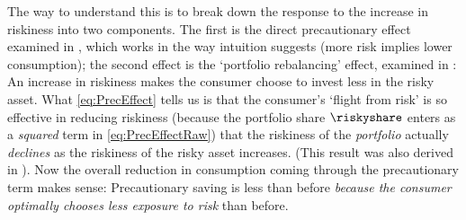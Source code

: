 The way to understand this is to break down the response to the
increase in riskiness into two components. The first is the direct
precautionary effect examined in , which works
in the way intuition suggests (more risk implies lower consumption);
the second effect is the `portfolio rebalancing' effect, examined in
: An increase in riskiness makes the consumer
choose to invest less in the risky asset.  What \eqref{eq:PrecEffect}
tells us is that the consumer's `flight from risk' is so effective in
reducing riskiness (because the portfolio share $\riskyshare$ enters
as a {\it squared} term in \eqref{eq:PrecEffectRaw}) that the
riskiness of the {\it portfolio} actually {\it declines} as the riskiness of
the risky asset increases.  (This result was also derived in
).  Now the overall reduction in consumption
coming through the precautionary term makes sense: Precautionary
saving is less than before {\it because the consumer optimally chooses less
  exposure to risk} than before.

